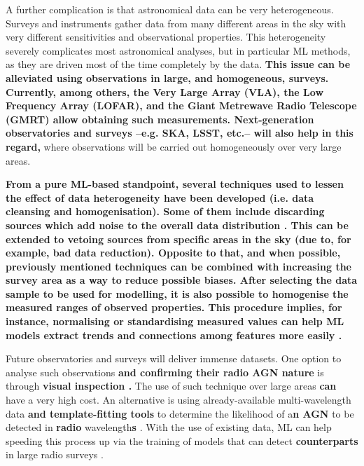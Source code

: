 \documentclass{aa}
\begin{document}
A further complication is that astronomical data can be very heterogeneous. 
Surveys and instruments gather data from many different areas in the sky with very different sensitivities and observational properties. This heterogeneity severely complicates most astronomical analyses, but in particular ML methods, as they are driven most of the time completely by the data. \textbf{This issue can be alleviated using observations in large, and homogeneous, surveys. Currently, among others, the Very Large Array (VLA), the Low Frequency Array (LOFAR), and the Giant Metrewave Radio Telescope (GMRT) allow obtaining such measurements. Next-generation observatories and surveys --e.g. SKA, LSST, etc.-- will also help in this regard,} where observations will be carried out homogeneously over very large areas.

\textbf{From a pure ML-based standpoint, several techniques used to lessen the effect of data heterogeneity have been developed (i.e. data cleansing and homogenisation). Some of them include discarding sources which add noise to the overall data distribution \citep{10.1145/3506712}. This can be extended to vetoing sources from specific areas in the sky (due to, for example, bad data reduction). Opposite to that, and when possible, previously mentioned techniques can be combined with increasing the survey area as a way to reduce possible biases.
After selecting the data sample to be used for modelling, it is also possible to homogenise the measured ranges of observed properties. This procedure implies, for instance, normalising or standardising measured values can help ML models extract trends and connections among features more easily \citep{SINGH2020105524}.}

Future observatories and surveys will deliver immense datasets. One option to analyse such observations \textbf{and confirming their radio AGN nature} is through \textbf{visual inspection \citep[e.g.][]{2015MNRAS.453.2326B}.} The use of such technique over large areas \textbf{can} have a very high cost. An alternative is using already-available multi-wavelength data \textbf{and template-fitting tools} to determine the likelihood of a\textbf{n AGN} to be detected in \textbf{radio} wavelength\textbf{s} \citep[see, for instance,][]{2023ApJ...944..141P}. With the use of existing data, ML can help speeding this process up via the training of models that can detect \textbf{counterparts} in large radio surveys \citep[see, for an example of the efforts done to achieve this goal,][]{2015PASA...32...37H, 2021MNRAS.500.3821B}. %
\end{document}
